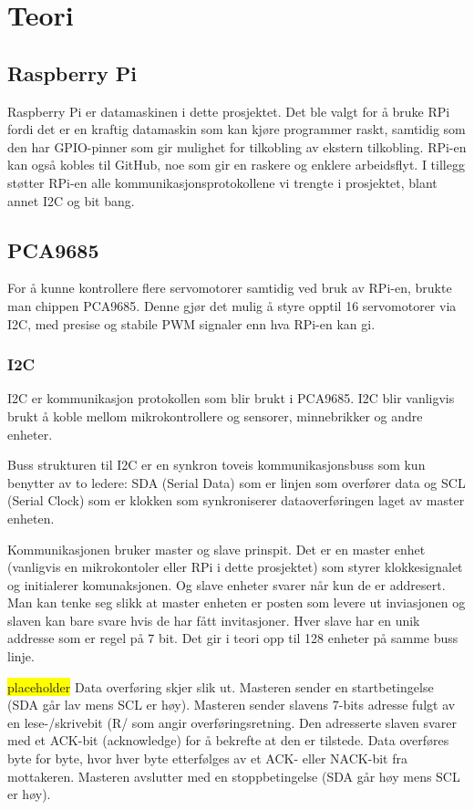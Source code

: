 \section{Teori}

\subsection{Raspberry Pi}
Raspberry Pi er datamaskinen i dette prosjektet. Det ble valgt for å bruke RPi fordi det er en kraftig datamaskin som kan kjøre programmer raskt, samtidig som den har GPIO-pinner som gir mulighet for tilkobling av ekstern tilkobling. RPi-en kan også kobles til GitHub, noe som gir en raskere og enklere arbeidsflyt. I tillegg støtter RPi-en alle kommunikasjonsprotokollene vi trengte i prosjektet, blant annet I2C og bit bang.

\subsection{PCA9685}
For å kunne kontrollere flere servomotorer samtidig ved bruk av RPi-en, brukte man chippen PCA9685. Denne gjør det mulig å styre opptil 16 servomotorer via I2C, med presise og stabile PWM signaler enn hva RPi-en kan gi.

\subsubsection{I2C}
I2C er kommunikasjon protokollen som blir brukt i PCA9685. I2C blir vanligvis brukt å koble mellom mikrokontrollere og sensorer, minnebrikker og andre enheter. 

Buss strukturen til I2C er en synkron toveis kommunikasjonsbuss som kun benytter av to ledere: SDA (Serial Data) som er linjen som overfører data og SCL (Serial Clock) som er klokken som synkroniserer dataoverføringen laget av master enheten.

Kommunikasjonen bruker master og slave prinspit. Det er en master enhet (vanligvis en mikrokontoler eller RPi i dette prosjektet) som styrer klokkesignalet og initialerer komunaksjonen. Og slave enheter svarer når kun de er addresert. Man kan tenke seg slikk at master enheten er posten som levere ut inviasjonen og slaven kan bare svare hvis de har fått invitasjoner. Hver slave har en unik addresse som er regel på 7 bit. Det gir i teori opp til 128 enheter på samme buss linje.

\colorbox{yellow}{placeholder}
Data overføring skjer slik ut. 
Masteren sender en startbetingelse (SDA går lav mens SCL er høy).
Masteren sender slavens 7-bits adresse fulgt av en lese-/skrivebit (R/ som angir overføringsretning.
Den adresserte slaven svarer med et ACK-bit (acknowledge) for å bekrefte at den er tilstede.
Data overføres byte for byte, hvor hver byte etterfølges av et ACK- eller NACK-bit fra mottakeren.
Masteren avslutter med en stoppbetingelse (SDA går høy mens SCL er høy).

